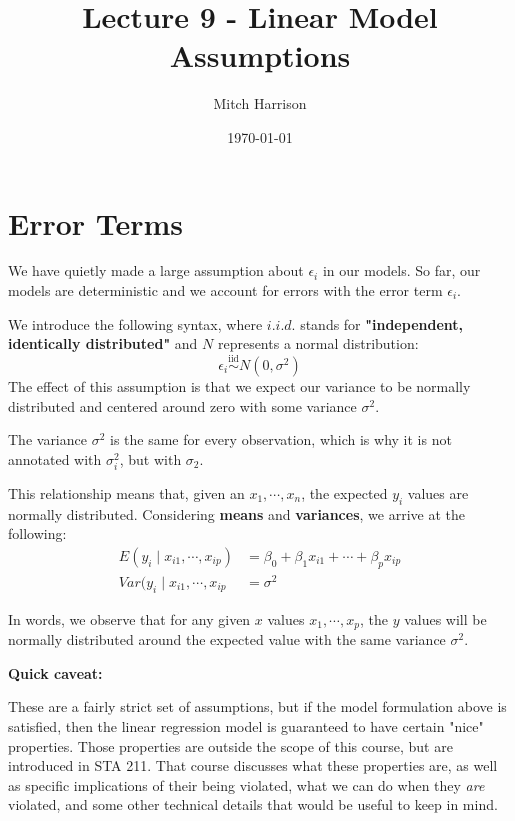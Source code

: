 \documentclass[titlepage, 12pt, leqno]{article}
\title{\Huge{Lecture 9 - Linear Model Assumptions}}
\author{\large{Mitch Harrison}}
\date{\today}
\begin{document}
\setlength{\parskip}{1\baselineskip}
\setlength{\parindent}{15pt}
\maketitle
\tableofcontents
\newpage


\section{Error Terms}

We have quietly made a large assumption about $\epsilon_i$ in our models. So far,
our models are deterministic and we account for errors with the error term
$\epsilon_i$.

We introduce the following syntax, where $i.i.d.$ stands for \textbf{
"independent, identically distributed"} and $N$ represents a normal distribution:
\[
    \boxed{\epsilon_i\overset{\mathrm{iid}}{\sim}N(0,\sigma^2)}
\]
The effect of this assumption is that we expect our variance to be normally
distributed and centered around zero with some variance $\sigma^2$.

\begin{note}
    The variance $\sigma^2$ is the same for every observation, which is why it is
    not annotated with $\sigma^2_i$, but with $\sigma_2$.
\end{note}

This relationship means that, given an $x_1, \cdots , x_n$, the expected $y_i$ 
values are normally distributed. Considering \textbf{means} and \textbf{
variances}, we arrive at the following:
\begin{align*}
    E(y_i \;|\; x_{i1}, \cdots , x_{ip}) &= \beta_0 + \beta_1x_{i1} + \cdots +
    \beta_p x_{ip} \\
    Var(y_i \;|\; x_{i1}, \cdots , x_{ip} &= \sigma^2
\end{align*}

In words, we observe that for any given $x$ values $x_1, \cdots , x_p$, the $y$
values will be normally distributed around the expected value with the same 
variance $\sigma^2$. 

\textbf{Quick caveat:} 

These are a fairly strict set of assumptions, but if the model formulation above
is satisfied, then the linear regression model is guaranteed to have certain
"nice" properties. Those properties are outside the scope of this course, but are
introduced in STA 211. That course discusses what these properties are, as well
as specific implications of their being violated, what we can do when they 
\textit{are} violated, and some other technical details that would be useful to
keep in mind.
\end{document}
